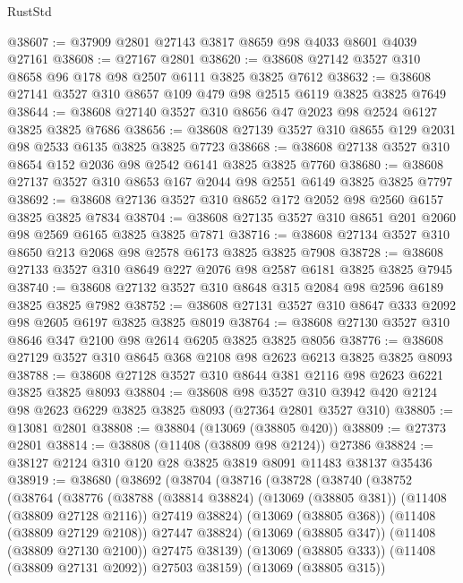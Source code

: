 \begin{lexlean}{RustStd}
\begin{coremodule}
@38607 := @37909 @2801 @27143 @3817 @8659 @98 @4033 @8601 @4039 @27161
@38608 := @27167 @2801
@38620 := @38608 @27142 @3527 @310 @8658 @96 @178 @98 @2507 @6111 @3825 @3825 @7612
@38632 := @38608 @27141 @3527 @310 @8657 @109 @479 @98 @2515 @6119 @3825 @3825 @7649
@38644 := @38608 @27140 @3527 @310 @8656 @47 @2023 @98 @2524 @6127 @3825 @3825 @7686
@38656 := @38608 @27139 @3527 @310 @8655 @129 @2031 @98 @2533 @6135 @3825 @3825 @7723
@38668 := @38608 @27138 @3527 @310 @8654 @152 @2036 @98 @2542 @6141 @3825 @3825 @7760
@38680 := @38608 @27137 @3527 @310 @8653 @167 @2044 @98 @2551 @6149 @3825 @3825 @7797
@38692 := @38608 @27136 @3527 @310 @8652 @172 @2052 @98 @2560 @6157 @3825 @3825 @7834
@38704 := @38608 @27135 @3527 @310 @8651 @201 @2060 @98 @2569 @6165 @3825 @3825 @7871
@38716 := @38608 @27134 @3527 @310 @8650 @213 @2068 @98 @2578 @6173 @3825 @3825 @7908
@38728 := @38608 @27133 @3527 @310 @8649 @227 @2076 @98 @2587 @6181 @3825 @3825 @7945
@38740 := @38608 @27132 @3527 @310 @8648 @315 @2084 @98 @2596 @6189 @3825 @3825 @7982
@38752 := @38608 @27131 @3527 @310 @8647 @333 @2092 @98 @2605 @6197 @3825 @3825 @8019
@38764 := @38608 @27130 @3527 @310 @8646 @347 @2100 @98 @2614 @6205 @3825 @3825 @8056
@38776 := @38608 @27129 @3527 @310 @8645 @368 @2108 @98 @2623 @6213 @3825 @3825 @8093
@38788 := @38608 @27128 @3527 @310 @8644 @381 @2116 @98 @2623 @6221 @3825 @3825 @8093
@38804 := @38608
    @98
    @3527
    @310
    @3942
    @420
    @2124
    @98
    @2623
    @6229
    @3825
    @3825
    @8093
    (@27364 @2801 @3527 @310)
@38805 := @13081 @2801
@38808 := @38804 (@13069 (@38805 @420))
@38809 := @27373 @2801
@38814 := @38808 (@11408 (@38809 @98 @2124)) @27386
@38824 := @38127 @2124 @310 @120 @28 @3825 @3819 @8091 @11483 @38137 @35436
@38919 := @38680
    (@38692
      (@38704
        (@38716
          (@38728
            (@38740
              (@38752
                (@38764
                  (@38776
                    (@38788
                      (@38814 @38824)
                      (@13069 (@38805 @381))
                      (@11408 (@38809 @27128 @2116))
                      @27419
                      @38824)
                    (@13069 (@38805 @368))
                    (@11408 (@38809 @27129 @2108))
                    @27447
                    @38824)
                  (@13069 (@38805 @347))
                  (@11408 (@38809 @27130 @2100))
                  @27475
                  @38139)
                (@13069 (@38805 @333))
                (@11408 (@38809 @27131 @2092))
                @27503
                @38159)
              (@13069 (@38805 @315))

\end{coremodule}
\end{lexlean}
